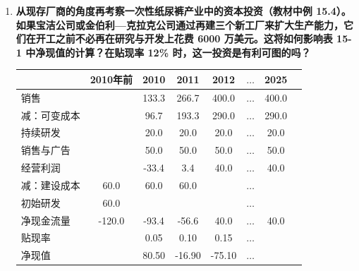 \begin{enumerate}[label=\textbf{\arabic*.}, leftmargin=*]
		解得最佳销售时间为 5 年。此时单箱净现值为 35.62 美元。由于每箱均能获利，应当买下全部 100 箱酒。
		
		在第 5 年出售时，每箱实际价值为 223.61 美元，因此 100 箱酒在出售时总共能得到 22361 美元（总净现值为 3562 美元）。
		
		对于第二问，若立即以 130 美元卖出，单箱锁定的当期利润仅为 30 美元。
		
		这低于继续保存 5 年所能带来的净现值 35.62 美元，因此不应当接受这个出价。
		
		对于第三问，当市场利率降至 5\% 时，投资的单箱净现值函数及其最优化条件随之发生改变。
		\[
		\begin{aligned}
			\text{净现值} &= -100 + e^{-0.05t} \cdot 100t^{0.5} \\
			\frac{\text{d}\text{净现值}}{\text{d}t} &= e^{-0.05t} \left(50t^{-0.5}\right) - 0.05e^{-0.05t} \cdot 100t^{0.5} = 0
		\end{aligned}
		\]
		
		此时解得最佳留存时间延长为 10 年，对应的单箱最大净现值大幅提升至 91.80 美元。
		
		因此仍应购买 100 箱酒，等待 10 年后再出售，届时每箱价值为 316.23 美元，总计可获得 31623 美元。
		\newpage
		\item \textbf{从现存厂商的角度再考察一次性纸尿裤产业中的资本投资（教材中例 15.4）。如果宝洁公司或金伯利—克拉克公司通过再建三个新工厂来扩大生产能力，它们在开工之前不必再在研究与开发上花费 6000 万美元。这将如何影响表 15-1 中净现值的计算？在贴现率 12\% 时，这一投资是有利可图的吗？}
		\begin{center}
			\footnotesize
			\setlength{\tabcolsep}{3pt}
			\renewcommand{\arraystretch}{1.2}
			\begin{tabular}{lccccccc}
				\hline
				& 2010年前 & 2010 & 2011 & 2012 & $\dots$ & 2025 \\ \hline
				销售 & & 133.3 & 266.7 & 400.0 & $\dots$ & 400.0 \\
				减：可变成本 & & 96.7 & 193.3 & 290.0 & $\dots$ & 290.0 \\
				持续研发 & & 20.0 & 20.0 & 20.0 & $\dots$ & 20.0 \\
				销售与广告 & & 50.0 & 50.0 & 50.0 & $\dots$ & 50.0 \\ \hline
				经营利润 & & -33.4 & 3.4 & 40.0 & $\dots$ & 40.0 \\ \hline
				减：建设成本 & 60.0 & 60.0 & 60.0 & & $\dots$ & \\
				初始研发 & 60.0 & & & & $\dots$ & \\ \hline
				净现金流量 & -120.0 & -93.4 & -56.6 & 40.0 & $\dots$ & 40.0 \\ \hline
				贴现率 & & 0.05 & 0.10 & 0.15 & $\dots$ & \\
				净现值 & & 80.50 & -16.90 & -75.10 & $\dots$ & \\ \hline
			\end{tabular}
		\end{center}
		

\end{enumerate}
